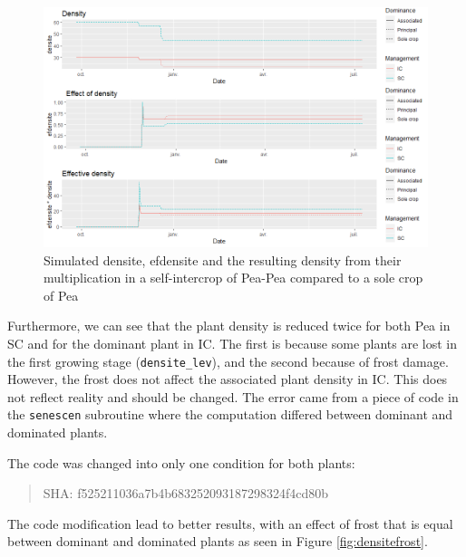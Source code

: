 \documentclass[
]{book}
\begin{document}
\begin{figure}
\centering
\includegraphics{img/density_effect.png}
\caption{\label{fig:densiteef}Simulated densite, efdensite and the resulting density from their multiplication in a self-intercrop of Pea-Pea compared to a sole crop of Pea}
\end{figure}

Furthermore, we can see that the plant density is reduced twice for both Pea in SC and for the dominant plant in IC. The first is because some plants are lost in the first growing stage (\texttt{densite\_lev}), and the second because of frost damage. However, the frost does not affect the associated plant density in IC. This does not reflect reality and should be changed.
The error came from a piece of code in the \texttt{senescen} subroutine where the computation differed between dominant and dominated plants.

The code was changed into only one condition for both plants:

\begin{quote}
SHA: f525211036a7b4b683252093187298324f4cd80b
\end{quote}

The code modification lead to better results, with an effect of frost that is equal between dominant and dominated plants as seen in Figure \ref{fig:densitefrost}.
\end{document}
